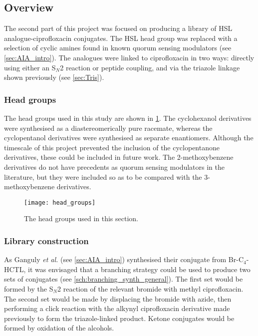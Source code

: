 \subsection{Overview}

The second part of this project was focused on producing a library of HSL analogue-ciprofloxacin conjugates. The HSL head group was replaced with a selection of cyclic amines found in known quorum sensing modulators (see \ref{sec:AIA_intro}). 
The analogues were linked to ciprofloxacin  in two ways: directly using either an S$_N$2 reaction or peptide coupling, and via the triazole linkage shown previously (see \ref{sec:Tris}).

\subsubsection{Head groups}

The head groups used in this study are shown in \ref{fig:head_groups}. The cyclohexanol derivatives were synthesised as a diastereomerically pure racemate, whereas the cyclopentanol derivatives were synthesised as separate enantiomers. 
Although the timescale of this project prevented the inclusion of the cyclopentanone derivatives, these could be included in future work.
The 2-methoxybenzene derivatives do not have precedents as quorum sensing modulators in the literature, but they were included so as to be compared with the 3-methoxybenzene derivatives.

\begin{figure}[H]
	\begin{center}
		\texttt{[image: head\_groups]}
		\caption{The head groups used in this section.\label{fig:head_groups}}
	\end{center}
\end{figure}

\subsubsection{Library construction}

As Ganguly \textit{et al.}\cite{Ganguly2011}  (see \ref{sec:AIA_intro}) synthesised their conjugate from Br-C$_4$-HCTL, it was envisaged that a branching strategy could be used to produce two sets of conjugates (see \ref{sch:branching_synth_general}). The first set would be formed by the S$_N$2 reaction of the relevant bromide with methyl ciprofloxacin. The second set would be made by displacing the bromide with azide, then performing a click reaction with the alkynyl ciprofloxacin derivative  made previously to form the triazole-linked product. Ketone conjugates would be formed by oxidation of the alcohols.

